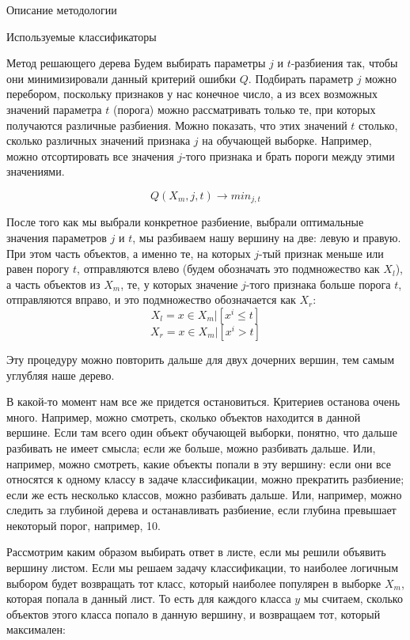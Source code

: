 \begin{section}{Описание методологии}
\begin{subsection}{Используемые классификаторы}
\begin{subsubsection}{Метод решающего дерева}
   Будем выбирать параметры $j$ и $t$-разбиения так, чтобы они минимизировали данный критерий ошибки $Q$. Подбирать параметр $j$ можно перебором, поскольку признаков у нас конечное число, а из всех возможных значений параметра $t$ (порога) можно рассматривать только те, при которых получаются различные разбиения. Можно показать, что этих значений $t$ столько, сколько различных значений признака $j$ на обучающей выборке. Например, можно отсортировать все значения $j$-того признака и брать пороги между этими значениями.

      \begin{equation}
	Q(X_m,j,t) \rightarrow min_{j,t}
  \end{equation}

   После того как мы выбрали конкретное разбиение, выбрали оптимальные значения параметров $j$ и $t$, мы разбиваем нашу вершину на две: левую и правую. При этом часть объектов, а именно те, на которых $j$-тый признак меньше или равен порогу $t$, отправляются влево (будем обозначать это подмножество как $X_l$), а часть объектов из $X_m$, те, у которых значение $j$-того признака больше порога $t$, отправляются вправо, и это подмножество обозначается как $X_r$:
         \begin{equation}
		X_l = {x \in X_m | [x^i \leq t ]}
  \end{equation}
           \begin{equation}
		X_r = {x \in X_m | [x^i > t ]}
  \end{equation}

   Эту процедуру можно повторить дальше для двух дочерних вершин, тем самым углубляя наше дерево.

   В какой-то момент нам все же придется остановиться. Критериев останова очень много. Например, можно смотреть, сколько объектов находится в данной вершине. Если там всего один объект обучающей выборки, понятно, что дальше разбивать не имеет смысла; если же больше, можно разбивать дальше. Или, например, можно смотреть, какие объекты попали в эту вершину: если они все относятся к одному классу в задаче классификации, можно прекратить разбиение; если же есть несколько классов, можно разбивать дальше. Или, например, можно следить за глубиной дерева и останавливать разбиение, если глубина превышает некоторый порог, например, 10.

	Рассмотрим каким образом выбирать ответ в листе, если мы решили объявить вершину листом.  Если мы решаем задачу классификации, то наиболее логичным выбором будет возвращать тот класс, который наиболее популярен в выборке $X_m$, которая попала в данный лист. То есть для каждого класса $y$ мы считаем, сколько объектов этого класса попало в данную вершину, и возвращаем тот, который максимален:


\end{subsubsection}
\end{subsection}
\end{section}
